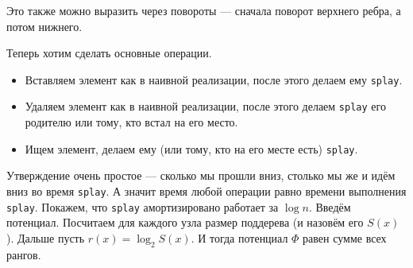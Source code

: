 \documentclass{article}
\newcommand{\pseudo}{PseudoLexer.py:PseudoLexer -x}
\newcommand{\pseudocode}[1]{\texttt{#1}}
\begin{document}
\begin{enumerate}
\begin{center}
            \qquad\qquad
        \end{center}
        Это также можно выразить через повороты --- сначала поворот верхнего ребра, а потом нижнего.
    \end{enumerate}
    Теперь хотим сделать основные операции.
    \begin{itemize}
        \item[\pseudocode{insert}] Вставляем элемент как в наивной реализации, после этого делаем ему \pseudocode{splay}.
        \item[\pseudocode{remove}] Удаляем элемент как в наивной реализации, после этого делаем \pseudocode{splay} его родителю или тому, кто встал на его место.
        \item[\pseudocode{find}] Ищем элемент, делаем ему (или тому, кто на его месте есть) \pseudocode{splay}.
    \end{itemize}
    Утверждение очень простое --- сколько мы прошли вниз, столько мы же и идём вниз во время \pseudocode{splay}. А значит время любой операции равно времени выполнения \pseudocode{splay}. Покажем, что \pseudocode{splay} амортизировано работает за $\log n$. Введём потенциал. Посчитаем для каждого узла размер поддерева (и назовём его $S(x)$). Дальше пусть $r(x)=\log_2S(x)$. И тогда потенциал $\Phi$ равен сумме всех рангов.
\end{document}
